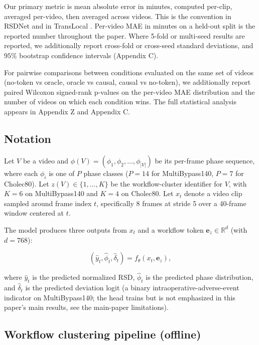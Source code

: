 Our primary metric is mean absolute error in minutes, computed per-clip,
averaged per-video, then averaged across videos. This is the convention
in RSDNet \citep{twinanda2019rsdnet} and in TransLocal \citep{loukas2024translocal}. Per-video MAE in minutes on a held-out split is the reported
number throughout the paper. Where 5-fold or multi-seed results are
reported, we additionally report cross-fold or cross-seed standard
deviations, and \(95\%\) bootstrap confidence intervals (Appendix C).

For pairwise comparisons between conditions evaluated on the same set of
videos (no-token vs oracle, oracle vs causal, causal vs no-token), we
additionally report paired Wilcoxon signed-rank p-values \citep{wilcoxon1945ranking} on the per-video MAE distribution and the number of videos on
which each condition wins. The full statistical analysis appears in
Appendix Z and Appendix C.

\subsection{Notation}\label{notation}

Let \(V\) be a video and
\(\phi(V) = (\phi_1, \phi_2, \ldots, \phi_{|V|})\) be its per-frame
phase sequence, where each \(\phi_i\) is one of \(P\) phase classes
(\(P = 14\) for MultiBypass140, \(P = 7\) for Cholec80). Let
\(z(V) \in \{1, \ldots, K\}\) be the workflow-cluster identifier for
\(V\), with \(K = 6\) on MultiBypass140 and \(K = 4\) on Cholec80. Let
\(x_t\) denote a video clip sampled around frame index \(t\),
specifically 8 frames at stride 5 over a 40-frame window centered at
\(t\).

The model produces three outputs from \(x_t\) and a workflow token
\(\mathbf{e}_z \in
\mathbb{R}^d\) (with \(d = 768\)):

\[
(\hat{y}_t, \hat{\phi}_t, \hat{\delta}_t) = f_\theta(x_t, \mathbf{e}_z),
\]

where \(\hat{y}_t\) is the predicted normalized RSD, \(\hat{\phi}_t\) is
the predicted phase distribution, and \(\hat{\delta}_t\) is the
predicted deviation logit (a binary intraoperative-adverse-event
indicator on MultiBypass140; the head trains but is not emphasized in
this paper's main results, see the main-paper limitations).

\subsection{Workflow clustering pipeline
(offline)}\label{workflow-clustering-pipeline-offline}

